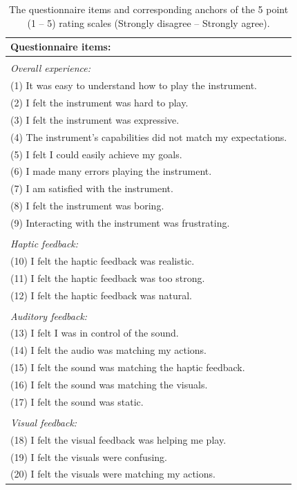 \documentclass[dvipsnames, pdftex]{article}
\begin{document}
\begin{table}[h]
\centering
  \small
    \begin{tabular}{p{}}
    \textbf{Questionnaire items:} \\
    \hline
    \\[-0.1in]
    \textit{Overall experience:} \\
    (1) It was easy to understand how to play the instrument.\\
    (2) I felt the instrument was hard to play.\\
    (3) I felt the instrument was expressive.\\
    (4) The instrument's capabilities did not match my expectations.\\
    (5) I felt I could easily achieve my goals.\\
    (6) I made many errors playing the instrument.\\
    (7) I am satisfied with the instrument.\\
    (8) I felt the instrument was boring.\\
    (9) Interacting with the instrument was frustrating.\\
    \hline
    \\[-0.1in]
    \textit{Haptic feedback:}  \\
    (10) I felt the haptic feedback was realistic.\\
    (11) I felt the haptic feedback was too strong.\\
    (12) I felt the haptic feedback was natural.\\
    \hline
    \\[-0.1in]
    \textit{Auditory feedback:}\\
    (13) I felt I was in control of the sound.\\
    (14) I felt the audio was matching my actions.\\
    (15) I felt the sound was matching the haptic feedback.\\
    (16) I felt the sound was matching the visuals.\\ 
    (17) I felt the sound was static.\\ 
    \hline
    \\[-0.1in]
    \textit{Visual feedback:}\\
    (18) I felt the visual feedback was helping me play.\\
    (19) I felt the visuals were confusing.\\
    (20) I felt the visuals were matching my actions.\\
    
    \hline
    \end{tabular}%
      \caption{The questionnaire items and corresponding anchors of the 5 point (1 -- 5) rating scales (Strongly disagree -- Strongly agree).}
  \label{tab:questions}
\end{table}
%
\end{document}

